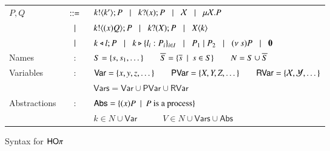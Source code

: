\begin{figure}[t!]
		\begin{tabular}{lcl}
			$P,Q$
			&$\;\;::=\;\;$&	$k ! \langle k' \rangle ; P \;\;\;|\;\;\; k ? (x) ; P \;\;\;|\;\;\; \mathcal{X} \;\;\;|\;\;\; \mu \mathcal{X}. P$\\
			&$\;\;\;|\;\;\;$&	$k ! \langle (x)Q \rangle ; P \;\;\;|\;\;\; k ? (X) ; P \;\;\;|\;\;\; X\langle k \rangle$\\ 
			&$\;\;\;|\;\;\;$&	$k \triangleleft l ; P \;\;\;|\;\;\; k \triangleright \{l_i:P_i\}_{i \in I} \;\;\;|\;\;\; 
					P_1 \;|\; P_2 \;\;\;|\;\;\; (\nu\ s) P \;\;\;|\;\;\; \mathbf{0}$\\
			Names & : & 	$S = \{s, s_1, \dots\} \qquad \overline{S} = \{\overline{s} \ \ |\ \  s \in S\} \qquad N = S \cup \overline{S}$\\
			Variables & : &	$\mathsf{Var} = \{x,y,z, \dots\} \qquad \mathsf{PVar} = \{X, Y, Z, \dots\}
					\qquad \mathsf{RVar} = \{\mathcal{X}, \mathcal{Y}, \dots\}$\\
				& &	$\mathsf{Vars} = \mathsf{Var} \cup \mathsf{PVar} \cup \mathsf{RVar}$\\
			Abstractions & : & $\mathsf{Abs} = \{(x)P \ \ |\ \  P \textrm{ is a process}\}$\\
				& &	$k \in N \cup \mathsf{Var} \quad \qquad V \in N \cup \mathsf{Vars} \cup \mathsf{Abs}$ 
		\end{tabular}
%
%

	\caption{Syntax for $\mathsf{HO}\pi$ \label{fig:syntax}}
\end{figure}

